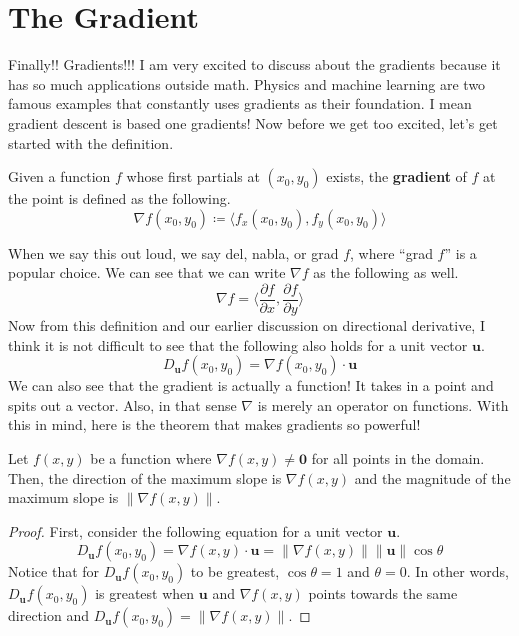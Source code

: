 \documentclass[../../../main.tex]{subfiles}
\begin{document}
\section{The Gradient}

Finally!! Gradients!!! I am very excited to discuss about the
gradients because it has so much applications outside math.
Physics and machine learning are two famous examples that constantly
uses gradients as their foundation. I mean gradient descent is based
one gradients! Now before we get too excited, let's get started with
the definition.

\begin{definition}{}{}
Given a function $f$ whose first partials at $(x_0, y_0)$ exists,
the \textbf{gradient} of $f$ at the point is defined as the following.
\vspace{-0.8\baselineskip}
\[
\nabla f(x_0, y_0)
\coloneqq \langle f_x(x_0, y_0), f_y(x_0, y_0) \rangle
\]
\end{definition}

When we say this out loud, we say del, nabla, or grad $f$,
where ``grad $f$'' is a popular choice. We can see that we can
write $\nabla f$ as the following as well.
\[
\nabla f
= \langle
    \frac{\partial f}{\partial x}, \frac{\partial f}{\partial y}
\rangle
\]
Now from this definition and our earlier discussion on directional
derivative, I think it is not difficult to see that the following
also holds for a unit vector $\mathbf{u}$.
\[
D_\mathbf{u} f(x_0, y_0) = \nabla f(x_0, y_0) \cdot \mathbf{u}
\]
We can also see that the gradient is actually a function! It takes
in a point and spits out a vector. Also, in that sense $\nabla$ is
merely an operator on functions. With this in mind, here is the
theorem that makes gradients so powerful!

\begin{theorem}{}{}
Let $f(x, y)$ be a function where $\nabla f(x, y) \neq \mathbf{0}$
for all points in the domain. Then, the direction of the maximum
slope is $\nabla f(x, y)$ and the magnitude of the maximum slope is
$\| \nabla f(x, y) \|$.
\end{theorem}
\begin{proof}
First, consider the following equation for a unit vector $\mathbf{u}$.
\[
D_\mathbf{u} f(x_0, y_0)
= \nabla f(x, y) \cdot \mathbf{u}
= \| \nabla f(x, y) \| \| \mathbf{u} \| \cos\theta
\]
Notice that for $D_\mathbf{u} f(x_0, y_0)$ to be greatest,
$\cos\theta = 1$ and $\theta = 0$. In other words,
$D_\mathbf{u} f(x_0, y_0)$ is greatest when $\mathbf{u}$ and
$\nabla f(x, y)$ points towards the same direction and
$D_\mathbf{u} f(x_0, y_0) = \| \nabla f(x, y) \|$.
\end{proof}
\end{document}
